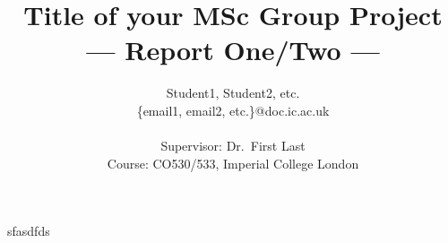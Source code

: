 \documentclass[a4paper,11pt]{article}
\title{Title of your MSc Group Project\\\Large{--- Report One/Two ---}}
\author{Student1, Student2, etc.\\
       \{email1, email2, etc.\}@doc.ic.ac.uk\\ \\
       \small{Supervisor: Dr.\ First Last}\\
       \small{Course: CO530/533, Imperial College London}
}
\begin{document}
\maketitle
sfasdfds
\end{document}
